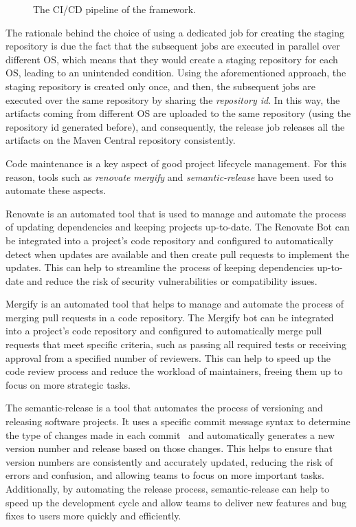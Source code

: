 \begin{figure}
	\centering
	\caption{The CI/CD pipeline of the framework.}
	\label{fig:ci-cd-pipeline}
\end{figure}

The rationale behind the choice of using a dedicated job for creating the staging repository is due the fact that the subsequent jobs are executed
in parallel over different OS, which means that they would create a staging repository for each OS, leading to an unintended condition.
Using the aforementioned approach, the staging repository is created only once, and then, the subsequent jobs are executed over the same repository
by sharing the \emph{repository id}. In this way, the artifacts coming from different OS are uploaded to the same repository (using the repository id
generated before), and consequently, the release job releases all the artifacts on the Maven Central repository consistently.

Code maintenance is a key aspect of good project lifecycle management.
For this reason, tools such as \emph{renovate} \emph{mergify} and \emph{semantic-release} have been used to automate these aspects.

Renovate is an automated tool that is used to manage and automate the process of updating
dependencies and keeping projects up-to-date. The Renovate Bot can be integrated into a project's code repository and configured to automatically
detect when updates are available and then create pull requests to implement the updates. This can help to streamline the process of keeping
dependencies up-to-date and reduce the risk of security vulnerabilities or compatibility issues.

Mergify is an automated tool that helps to manage and automate the process of merging pull requests in a code repository. The Mergify bot
can be integrated into a project's code repository and configured to automatically merge pull requests that meet specific criteria, such as passing
all required tests or receiving approval from a specified number of reviewers. This can help to speed up the code review process and reduce the
workload of maintainers, freeing them up to focus on more strategic tasks.

The semantic-release is a tool that automates the process of versioning and releasing software projects. It uses a specific commit message syntax to
determine the type of changes made in each commit~\cite{conventional-commits} and automatically generates a new version number and release based on
those changes.
This helps to ensure that version numbers are consistently and accurately updated, reducing the risk of errors and confusion, and allowing teams to
focus on more important tasks. Additionally, by automating the release process, semantic-release can help to speed up the development cycle and allow
teams to deliver new features and bug fixes to users more quickly and efficiently.

